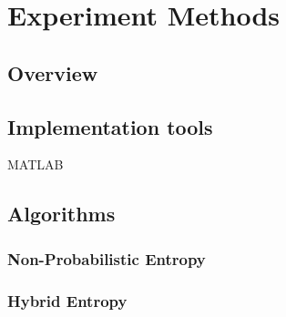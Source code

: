 \chapter{Experiment Methods}





\section{Overview}

\section{Implementation tools}

MATLAB

\section{Algorithms}

\subsection{Non-Probabilistic Entropy}

\subsection{Hybrid Entropy}

